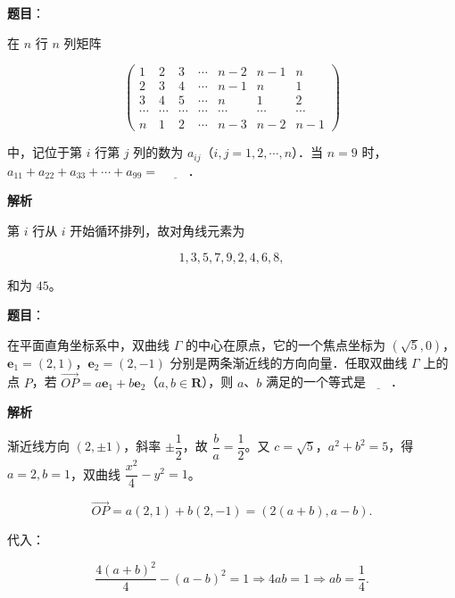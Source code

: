 \begin{answer}

\textbf{题目}：

在 $n$ 行 $n$ 列矩阵

\nopagebreak[4]
\[\begin{pmatrix}
1&2&3&\cdots&n-2&n-1&n\\
2&3&4&\cdots&n-1&n&1\\
3&4&5&\cdots&n&1&2\\
\cdots&\cdots&\cdots&\cdots&\cdots&\cdots&\cdots\\
n&1&2&\cdots&n-3&n-2&n-1
\end{pmatrix}\]

中，记位于第 $i$ 行第 $j$ 列的数为 $a_{ij}$（$i,j=1,2,\cdots,n$）．当 $n=9$ 时，$a_{11}+a_{22}+a_{33}+\cdots+a_{99}=$ $\underline{\qquad}$．

\textbf{解析}

第 $i$ 行从 $i$ 开始循环排列，故对角线元素为

\nopagebreak[4]
\[1,3,5,7,9,2,4,6,8,\]

和为 $45$。


\end{answer}
\begin{answer}

\textbf{题目}：

在平面直角坐标系中，双曲线 $\Gamma$ 的中心在原点，它的一个焦点坐标为 $(\sqrt5,0)$，$\boldsymbol e_1=(2,1)$，$\boldsymbol e_2=(2,-1)$ 分别是两条渐近线的方向向量．任取双曲线 $\Gamma$ 上的点 $P$，若 $\overrightarrow{OP}=a\boldsymbol e_1+b\boldsymbol e_2$（$a,b\in\mathbf R$），则 $a$、$b$ 满足的一个等式是$\underline{\qquad}$．

\textbf{解析}

渐近线方向 $(2,\pm1)$，斜率 $\pm\dfrac12$，故 $\dfrac ba=\dfrac12$。又 $c=\sqrt5$，$a^2+b^2=5$，得 $a=2,b=1$，双曲线 $\dfrac{x^2}4-y^2=1$。

\nopagebreak[4]
\[\overrightarrow{OP}=a(2,1)+b(2,-1)=(2(a+b),a-b).\]

代入：

\nopagebreak[4]
\[\frac{4(a+b)^2}{4}-(a-b)^2=1
\Longrightarrow 4ab=1
\Longrightarrow ab=\frac14.\]


\end{answer}
